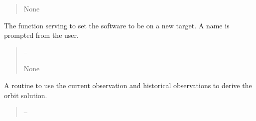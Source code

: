 \documentclass[letterpaper,11pt,english]{sphinxmanual}
\begin{document}
\begin{savenotes}
\begin{fulllineitems}
\begin{savenotes}
\begin{fulllineitems}
\begin{quote}
\begin{description}
\sphinxAtStartPar
None

\end{description}\end{quote}

\end{fulllineitems}\end{savenotes}


\begin{savenotes}\begin{fulllineitems}
\label{\detokenize{code/opihiexarata.gui.manual:opihiexarata.gui.manual.OpihiManualWindow.__connect_push_button_new_target}}
\pysigstartsignatures
{}
\pysigstopsignatures
\sphinxAtStartPar
The function serving to set the software to be on a new target.
A name is prompted from the user.
\begin{quote}\begin{description}
\sphinxAtStartPar
{} – 

\sphinxAtStartPar
None

\end{description}\end{quote}

\end{fulllineitems}\end{savenotes}


\begin{savenotes}\begin{fulllineitems}
\label{\detokenize{code/opihiexarata.gui.manual:opihiexarata.gui.manual.OpihiManualWindow.__connect_push_button_orbit_solve_ephemeris}}
\pysigstartsignatures
{}
\pysigstopsignatures
\sphinxAtStartPar
A routine to use the current observation and historical observations
to derive the orbit solution.
\begin{quote}\begin{description}
\sphinxAtStartPar
{} – 


\end{description}
\end{quote}
\end{fulllineitems}
\end{savenotes}
\end{fulllineitems}
\end{savenotes}
\end{document}
